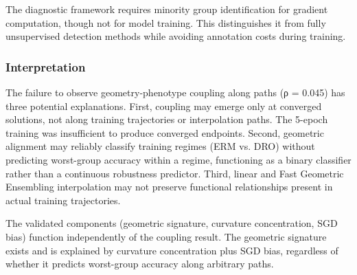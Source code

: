 The diagnostic framework requires minority group identification for gradient computation, though not for model training. This distinguishes it from fully unsupervised detection methods while avoiding annotation costs during training.

\subsubsection{Interpretation}

The failure to observe geometry-phenotype coupling along paths (ρ = 0.045) has three potential explanations. First, coupling may emerge only at converged solutions, not along training trajectories or interpolation paths. The 5-epoch training was insufficient to produce converged endpoints. Second, geometric alignment may reliably classify training regimes (ERM vs. DRO) without predicting worst-group accuracy within a regime, functioning as a binary classifier rather than a continuous robustness predictor. Third, linear and Fast Geometric Ensembling interpolation may not preserve functional relationships present in actual training trajectories.

The validated components (geometric signature, curvature concentration, SGD bias) function independently of the coupling result. The geometric signature exists and is explained by curvature concentration plus SGD bias, regardless of whether it predicts worst-group accuracy along arbitrary paths.
